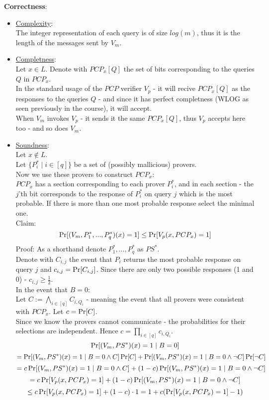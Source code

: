 \textbf{Correctness}:
\begin{itemize}
	\item \underline{Complexity}:\\
		The integer representation of each query is of size $log(m)$,
		thus it is the length of the messages sent by $V_m$.
	\item \underline{Completness}:\\
		Let $x\in L$. Denote with $PCP_x[Q]$ the set of bits
		corresponding to the queries $Q$ in $PCP_x$.\\
		In the standard usage of the $PCP$ verifier $V_p$ - 
		it will recive $PCP_x[Q]$ as the responses to the queries $Q$ - 
		and since it has perfect completness (WLOG as seen previously in the course),
		it will accept.\\
		When $V_m$ invokes $V_p$ - it sends it the same $PCP_x[Q]$,
		thus $V_p$ accepts here too - and so does $V_m$.
	\item \underline{Soundness}:\\
		Let $x\notin L$.\\
		Let $\{P_i^*\mid i\in[q]\}$ be a set of (possibly mallicious) provers.\\
		
		Now we use these provers to construct $PCP_x$:\\
		$PCP_x$ has a section corresponding to each prover $P_i^*$, and in each section - 
		the $j$'th bit corresponds to the response of $P_i^*$ on query $j$ which
		is the most probable. If there is more than one most probable response
		select the minimal one.\\

		Claim:
		\[
			\operatorname*{Pr}[(V_m,P_1^*,...,P_q^*)(x)=1]
			\leq \operatorname*{Pr}[V_p(x, PCP_x)=1]
		\]
		Proof:
		As a shorthand denote $P_1^*,...,P_q^*$ as $PS^*$.\\

		Denote with $C_{i,j}$ the event that $P_i$ returns the most
		probable response on query $j$ and $c_{i,j}=\operatorname*{Pr}[C_{i,j}]$.
		Since there are only two possible
		responses (1 and 0) - $c_{i,j}\geq\frac{1}{2}$.\\

		In the event that $B=0$:\\
		Let $C:= \bigwedge_{i\in [q]}C_{i,Q_i}$ - meaning the event that
		all provers were consistent with $PCP_x$. Let $c=\operatorname*{Pr}[C]$.\\
		Since we know the provers cannot communicate - the probabilities for their
		selections are independent. Hence $c=\prod_{i\in [q]}c_{i,Q_i}$.
		\[
			\operatorname*{Pr}[(V_m,PS^*)(x)=1\mid B=0]	
		\]
		\[
			=\operatorname*{Pr}[(V_m,PS^*)(x)=1\mid B=0\wedge C]\operatorname*{Pr}[C]
			+\operatorname*{Pr}[(V_m,PS^*)(x)=1\mid B=0\wedge \neg C]\operatorname*{Pr}[\neg C]
		\]
		\[
			=c\operatorname*{Pr}[(V_m,PS^*)(x)=1\mid B=0\wedge C]
			+(1-c)\operatorname*{Pr}[(V_m,PS^*)(x)=1\mid B=0\wedge \neg C]
		\]
		\[
			=c\operatorname*{Pr}[V_p(x, PCP_x)=1]
			+(1-c)\operatorname*{Pr}[(V_m,PS^*)(x)=1\mid B=0\wedge \neg C]
		\]
		\[
			\leq c\operatorname*{Pr}[V_p(x, PCP_x)=1]+(1-c)\cdot 1
			=1+c(\operatorname*{Pr}[V_p(x, PCP_x)=1]-1)
		\]


\end{itemize}
